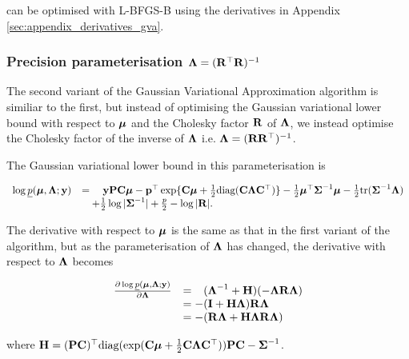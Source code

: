 can be optimised with L-BFGS-B using the derivatives in Appendix \ref{sec:appendix_derivatives_gva}.
	
\subsubsection{Precision parameterisation ${\boldsymbol \Lambda} = ({\bf R}^\top {\bf R})^{-1}$}
		
\noindent The second variant of the Gaussian Variational Approximation algorithm is similiar to the first, but
instead of optimising the Gaussian variational lower bound with respect to ${\boldsymbol \mu}$ and the Cholesky factor
${\bf R}$ of ${\boldsymbol \Lambda}$, we instead optimise the Cholesky factor of the inverse of ${\boldsymbol \Lambda}$ i.e. ${\boldsymbol \Lambda} =
({\bf R} {\bf R}^\top)^{-1}$.

The Gaussian variational lower bound in this parameterisation is

\begin{equation}
\begin{array}{ll}
	\log \underline{p}({\boldsymbol \mu}, {\boldsymbol \Lambda}; {\bf y}) & = \quad {\bf y}{\bf P}{\bf C} {\boldsymbol\mu} - {\bf p}^\top \exp\{{\bf C} {\boldsymbol \mu} + \tfrac{1}{2} \text{diag}({\bf C} {\boldsymbol \Lambda} {\bf C}^\top)\} - \tfrac{1}{2} {\boldsymbol \mu}^\top {\boldsymbol\Sigma}^{-1} {\boldsymbol \mu} - \tfrac{1}{2} \text{tr}{({\boldsymbol\Sigma}^{-1} {\boldsymbol\Lambda})} \\
	                                        & \quad+ \tfrac{1}{2} \log{|{\boldsymbol\Sigma}^{-1}|} + \tfrac{p}{2} - \log{|{\bf R}|}.                                             
\end{array}
\end{equation}
		
\noindent The derivative with respect to ${\boldsymbol \mu}$ is the same as that in the first variant of the algorithm, but 
as the parameterisation of ${\boldsymbol \Lambda}$ has changed, the  derivative with respect to ${\boldsymbol \Lambda}$ becomes

\begin{equation}
\begin{array}{ll}
	\frac{\partial \log \underline{p}({\boldsymbol \mu}, {\boldsymbol \Lambda}; {\bf y})}{\partial {\boldsymbol\Lambda}}
	  & = \hphantom{-}({\boldsymbol \Lambda}^{-1} + {\bf H})(-{\boldsymbol \Lambda} {\bf R} {\boldsymbol \Lambda}) \\
	  & = -({\bf I} + {\bf H}{\boldsymbol \Lambda}){\bf R}{\boldsymbol \Lambda}                           \\
	  & = - ({\bf R}{\boldsymbol \Lambda} + {\bf H}{\boldsymbol \Lambda}{\bf R}{\boldsymbol \Lambda})                  
\end{array}
\end{equation}
		
\noindent where ${\bf H} = ({\bf P} {\bf C})^\top \text{diag}(\exp({\bf C} {\boldsymbol \mu} + \frac{1}{2} {\bf C} {\boldsymbol \Lambda} {\bf C}^\top)) {\bf P} {\bf C} - {\boldsymbol \Sigma}^{-1}$.
		
